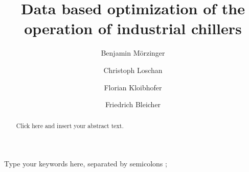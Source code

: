 \documentclass[3p,times,procedia,twocolumn,twoside]{elsarticle}
\begin{document}
\begin{frontmatter}




\title{Data based optimization of the operation of industrial chillers}




\author[a,*]{Benjamin M\"orzinger}
\author[a]{Christoph Loschan}
\author[a]{Florian Kloibhofer}
\author[a]{Friedrich Bleicher}

\address[a]{Institute for Production Engineering and Laser Technology, TU Wien, Getreidemarkt 9, Vienna, 1060, Austria}

\begin{abstract}
Click here and insert your abstract text.
\end{abstract}

\begin{keyword}
Type your keywords here, separated by semicolons ;



\end{keyword}
\end{frontmatter}
\end{document}
